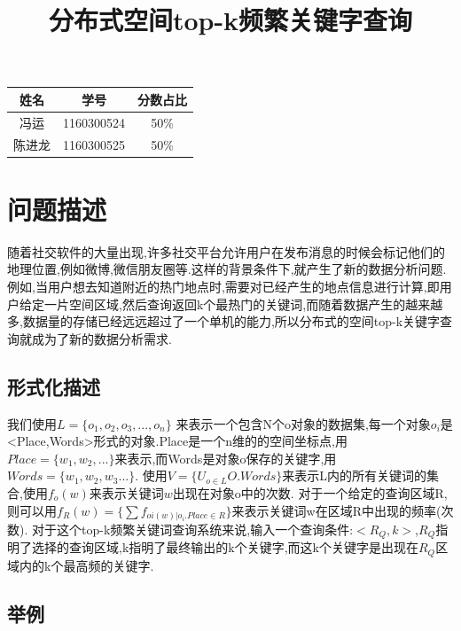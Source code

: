 \documentclass{elegantpaper}
\title{分布式空间top-k频繁关键字查询}
\begin{document}
\maketitle

\begin{table}[!htbp]
    \centering
    \begin{tabular}{ccc}
    姓名&学号&分数占比\\
    \hline
    冯运&1160300524&50\%\\
    陈进龙&1160300525&50\%\\
    \end{tabular}
\end{table}

\begin{abstract}
\end{abstract}

\section{问题描述}

随着社交软件的大量出现,许多社交平台允许用户在发布消息的时候会标记他们的地理位置,例如微博,微信朋友圈等.这样的背景条件下,就产生了新的数据分析问题.例如,当用户想去知道附近的热门地点时,需要对已经产生的地点信息进行计算,即用户给定一片空间区域,然后查询返回k个最热门的关键词,而随着数据产生的越来越多,数据量的存储已经远远超过了一个单机的能力,所以分布式的空间top-k关键字查询就成为了新的数据分析需求.

\subsection{形式化描述}
我们使用$L=\{o_1,o_2,o_3,...,o_n\} $ 来表示一个包含N个o对象的数据集,每一个对象$o_i$是<Place,Words>形式的对象.Place是一个n维的的空间坐标点,用$Place=\{w_1,w_2,...\}$来表示,而Words是对象o保存的关键字,用$Words=\{w_1,w_2,w_3... \}$.\newline
使用$V=\{U_{o\in L}O.Words\}$来表示L内的所有关键词的集合,使用$f_o(w)$来表示关键词$w$出现在对象o中的次数.\newline
对于一个给定的查询区域R,则可以用$f_R(w)=\{\sum{f_{oi(w)|o_i.Place\in R}} \}$来表示关键词w在区域R中出现的频率(次数).\newline
对于这个top-k频繁关键词查询系统来说,输入一个查询条件:$<R_Q,k>$,$R_Q$指明了选择的查询区域,k指明了最终输出的k个关键字,而这k个关键字是出现在$R_Q$区域内的k个最高频的关键字.\newline

\subsection{举例}
\end{document}
